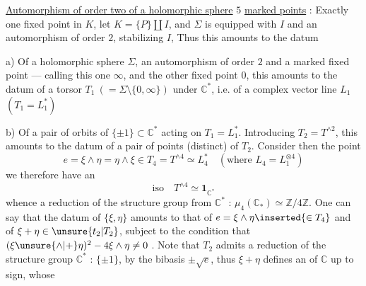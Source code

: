 \uline{Automorphism of order two of a holomorphic sphere} \inserted{$\Sigma$}
\uline{}  $5$ \uline{marked points} : Exactly one fixed point in $K$,
let $K=\{P\}\amalg I$, and $\Sigma$ is equipped with $I$ and an automorphism
\inserted{$\sigma$} of order $2$, stabilizing $I$,
Thus this amounts to the datum

a) Of a holomorphic sphere $\Sigma$, an automorphism \inserted{$\sigma$} of order $2$
and a marked fixed point --- calling this one $\infty$, and the other fixed point $0$,
this amounts to the datum of a torsor $T_1\ (= \Sigma\setminus\{0,\infty\})$
under $\mathbb C^*$, i.e. of a complex vector line $L_1$
$(T_1=L_1^*)$

b) Of a pair of  orbits of
$\{\pm1\}\subset\mathbb C^*$ acting on $T_1=L_1^*$.
Introducing $T_2=T^{\wedge2}$, this amounts to the datum of a pair of points
\inserted{$\{\xi,\eta\}$} (distinct) of $T_2$.
Consider then the point
\[
 e=\xi\wedge\eta=\eta\wedge\xi
 \in T_4=T^{\wedge4}\simeq L_4^*
 \quad(\text{where }L_4=L_1^{\otimes4})
\]
we therefore have an
\[
 \mathrm{iso}\quad T^{\wedge4}\simeq\mathbf1_{\mathbb C^*}
\]
whence a reduction of the structure group 
from $\mathbb C^*$ : $\mu_4(\mathbb C_*)\simeq\mathbb Z/4\mathbb Z$.
One can say that the datum of $\{\xi,\eta\}$ amounts to that of
$e=\xi\wedge\eta\inserted{\in T_4}$ and of
$\xi+\eta\in\unsure{t_2|T_2}$, subject to the condition that
$(\xi\unsure{\wedge|+}\eta)^2-4\xi\wedge\eta\ne0$ .
Note 
that $T_2$ admits a reduction of the structure group $\mathbb C^*$ :
$\{\pm1\}$, by the bibasis $\pm\sqrt e$, thus $\xi+\eta$
defines an  of $\mathbb C$ up to sign, whose
